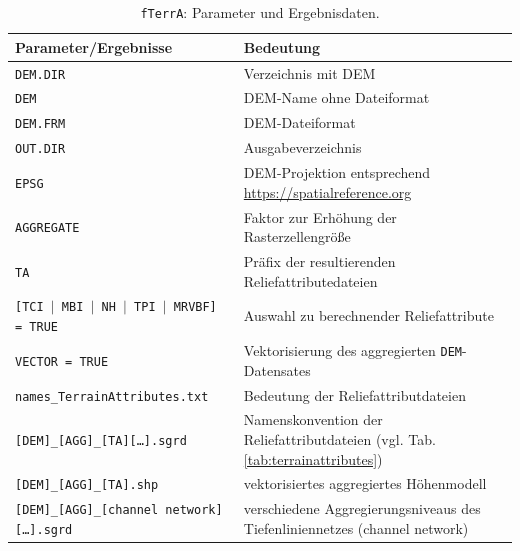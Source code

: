 \begin{table}[p]
	\caption{\texttt{fTerrA}: Parameter und Ergebnisdaten.}
	\centering
	\begin{tabularx}{\textwidth}{l|X}
		\toprule
		\textbf{Parameter/Ergebnisse} & \textbf{Bedeutung} \\
		\midrule
		\texttt{DEM.DIR} & Verzeichnis mit DEM\\ \midrule
		\texttt{DEM} & DEM-Name ohne Dateiformat \\ \midrule
	    \texttt{DEM.FRM} & DEM-Dateiformat\\ \midrule
		\texttt{OUT.DIR} & Ausgabeverzeichnis\\\midrule
		\texttt{EPSG} & DEM-Projektion entsprechend \url{https://spatialreference.org}\\\midrule
		\texttt{AGGREGATE} & Faktor zur Erhöhung der Rasterzellengröße\\\midrule
		\texttt{TA} & Präfix der resultierenden Reliefattributedateien\\\midrule
		\texttt{[TCI $|$ MBI $|$ NH $|$ TPI $|$ MRVBF] = TRUE} & Auswahl zu berechnender Reliefattribute\\\midrule
		\texttt{VECTOR = TRUE} & Vektorisierung des aggregierten \texttt{DEM}-Datensates\\
		\midrule
		\texttt{names\_TerrainAttributes.txt} & Bedeutung der Reliefattributdateien\\\midrule\midrule
		\texttt{[DEM]\_\text{AGGREGATE}[AGG]\_[TA][\dots].sgrd} & Namenskonvention der Reliefattributdateien (vgl. Tab. \ref{tab:terrainattributes})\\\midrule
		\texttt{[DEM]\_\text{AGGREGATE}[AGG]\_[TA].shp} & vektorisiertes aggregiertes Höhenmodell\\\midrule
		\texttt{[DEM]\_\text{AGGREGATE}[AGG]\_[channel network][\dots].sgrd} & verschiedene Aggregierungsniveaus des Tiefenliniennetzes (channel network)\\\bottomrule
	\end{tabularx}
	\label{tab:fTerrA}%
\end{table}


